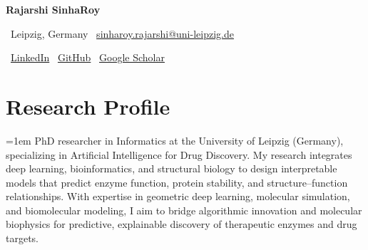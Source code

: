 \documentclass[10pt,a4paper]{article}
\newcommand{\sep}{\quad\textbar\quad}
\begin{document}
\begin{center}
  {\LARGE\bfseries Rajarshi SinhaRoy}\par\vspace{5pt}
  {\small
  \faMapMarker*\ Leipzig, Germany\sep
  \faEnvelope\ \href{mailto:sinharoy.rajarshi@uni-leipzig.de}{sinharoy.rajarshi@uni-leipzig.de}\par\vspace{3pt}
  \faLinkedin\ \href{https://www.linkedin.com/in/rajarshi-sinharoy}{LinkedIn}\sep
  \faGithub\ \href{https://github.com/Zadak-H}{GitHub}\sep
  \faGraduationCap\ \href{https://scholar.google.com/citations?user=CQJhB0IAAAAJ}{Google Scholar}}
\end{center}

\section{Research Profile}
{\fontsize{10.95}{13.8}\selectfont{}\emergencystretch=1em
PhD researcher in Informatics at the University of Leipzig (Germany), specializing in Artificial Intelligence
for Drug Discovery. My research integrates deep learning, bioinformatics, and structural biology to design
interpretable models that predict enzyme function, protein stability, and structure–function relationships.
With expertise in geometric deep learning, molecular simulation, and biomolecular modeling, I aim to bridge
algorithmic innovation and molecular biophysics for predictive, explainable discovery of therapeutic enzymes
and drug targets.\par}

\end{document}
